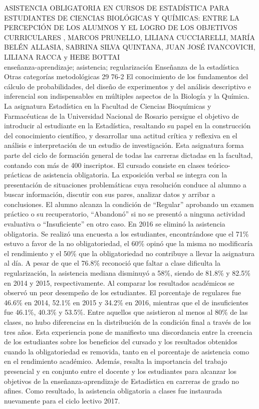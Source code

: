 \A
{ASISTENCIA OBLIGATORIA EN CURSOS DE ESTADÍSTICA PARA ESTUDIANTES DE CIENCIAS BIOLÓGICAS Y QUÍMICAS: ENTRE LA PERCEPCIÓN DE LOS ALUMNOS Y EL LOGRO DE LOS OBJETIVOS CURRICULARES}
{, MARCOS PRUNELLO, LILIANA CUCCIARELLI, MARÍA BELÉN ALLASIA, SABRINA SILVA QUINTANA, JUAN JOSÉ IVANCOVICH, LILIANA RACCA y HEBE BOTTAI}
{
\\}
{enseñanza-aprendizaje; asistencia; regularización} 
 {Enseñanza de la estadística} 
 {Otras categorías metodológicas} 
 {29} 
 {76-2}
{El conocimiento de los fundamentos del cálculo de probabilidades, del diseño de experimentos y del análisis descriptivo e inferencial son indispensables en múltiples aspectos de la Biología y la Química. La asignatura Estadística en la Facultad de Ciencias Bioquímicas y Farmacéuticas de la Universidad Nacional de Rosario persigue el objetivo de introducir al estudiante en la Estadística, resaltando su papel en la construcción del conocimiento científico, y desarrollar una actitud crítica y reflexiva en el análisis e interpretación de un estudio de investigación. Esta asignatura forma parte del ciclo de formación general de todas las carreras dictadas en la facultad, contando con más de 400 inscriptos. El cursado consiste en clases teórico-prácticas de asistencia obligatoria. La exposición verbal se integra con la presentación de situaciones problemáticas cuya resolución conduce al alumno a buscar información, discutir con sus pares, analizar datos y arribar a conclusiones. El alumno alcanza la condición de “Regular” aprobando un examen práctico o su recuperatorio, “Abandonó” si no se presentó a ninguna actividad evaluativa o “Insuficiente” en otro caso. En 2016 se eliminó la asistencia obligatoria. Se realizó una encuesta a los estudiantes, encontrándose que el 71\% estuvo a favor de la no obligatoriedad, el 60\% opinó que la misma no modificaría el rendimiento y el 50\% que la obligatoriedad no contribuye a llevar la asignatura al día. A pesar de que el 76.8\% reconoció que faltar a clase dificulta la regularización, la asistencia mediana disminuyó a 58\%, siendo de 81.8\% y 82.5\% en 2014 y 2015, respectivamente. Al comparar los resultados académicos se observó un peor desempeño de los estudiantes. El porcentaje de regulares fue 46.6\% en 2014, 52.1\% en 2015 y 34.2\% en 2016, mientras que el de insuficientes fue 46.1\%, 40.3\% y 53.5\%. Entre aquellos que asistieron al menos al 80\% de las clases, no hubo diferencias en la distribución de la condición final a través de los tres años. Esta experiencia pone de manifiesto una discordancia entre la creencia de los estudiantes sobre los beneficios del cursado y los resultados obtenidos cuando la obligatoriedad es removida, tanto en el porcentaje de asistencia como en el rendimiento académico. Además, resalta la importancia del trabajo presencial y en conjunto entre el docente y los estudiantes para alcanzar los objetivos de la enseñanza-aprendizaje de Estadística en carreras de grado no afines. Como resultado, la asistencia obligatoria a clases fue instaurada nuevamente para el ciclo lectivo 2017.}
